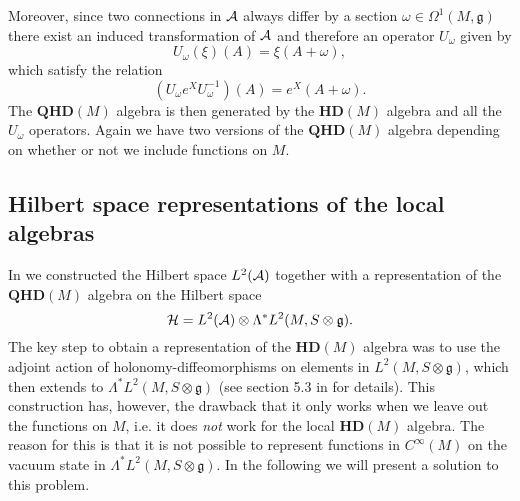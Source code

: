 \documentclass[12pt]{article}
\def\oo{\omega}
\def\ca{{\cal A}}
\def\ch{{\cal H}}
\begin{document}
Moreover, since two connections in $\ca$ always differ by a section $\omega \in \Omega^1(M,\mathfrak{g})$ there exist an induced transformation of $\ca$ and therefore an operator $U_\omega $ given by   
$$U_\omega (\xi )(A) = \xi (A + \omega) ,$$ 
%
%
which satisfy the relation 
\begin{equation} \label{konj}
(U_{\omega} e^X U_{ \omega}^{-1}) (A) = e^X (A + \omega )  .
\end{equation}
The $\mathbf{QHD}(M)$ algebra is then generated by the $\mathbf{HD}(M)$ algebra and all the $U_\oo$ operators. Again we have two versions of the $\mathbf{QHD}(M)$ algebra depending on whether or not we include functions on $M$.










\subsection{Hilbert space representations of the local algebras}



In \cite{Aastrup:2019yui} we constructed the Hilbert space $L^2(\ca)$ together with a representation of the $\mathbf{QHD}(M)$ algebra on the Hilbert space 
$$
\ch=L^2(\ca)\otimes \Lambda^*L^2(M,S\otimes\mathfrak{g}).
$$ 
The key step to obtain a representation of the $\mathbf{HD}(M)$ algebra was to use the adjoint action of holonomy-diffeomorphisms on elements in $L^2(M,S\otimes\mathfrak{g})$, which then extends to $\Lambda^*L^2(M,S\otimes\mathfrak{g})$ (see section 5.3 in \cite{Aastrup:2019yui} for details). 
This construction has, however, the drawback that it only works when we leave out the functions on $M$, i.e. it does {\it not} work for the local $\mathbf{HD}(M)$ algebra. The reason for this is that it is not possible to represent functions in $C^\infty(M)$ on the vacuum state in $\Lambda^*L^2(M,S\otimes\mathfrak{g})$. In the following we will present a solution to this problem.
\end{document}
